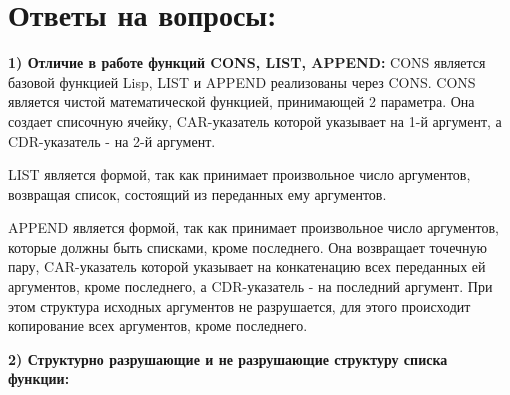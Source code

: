 \documentclass[a4paper, 12pt]{article}
\begin{document}
\section*{Ответы на вопросы:}
\hspace*{-7mm} \textbf{1) Отличие в работе функций CONS, LIST, APPEND:}
CONS является базовой функцией Lisp, LIST и APPEND реализованы через CONS. CONS является чистой математической функцией, принимающей 2 параметра. Она создает списочную ячейку, CAR-указатель которой указывает на 1-й аргумент, а CDR-указатель - на 2-й аргумент.

LIST является формой, так как принимает произвольное число аргументов, возвращая список, состоящий из переданных ему аргументов.

APPEND является формой, так как принимает произвольное число аргументов, которые должны быть списками, кроме последнего. Она возвращает точечную пару, CAR-указатель которой указывает на конкатенацию всех переданных ей аргументов, кроме последнего, а CDR-указатель - на последний аргумент. При этом структура исходных аргументов не разрушается, для этого происходит копирование всех аргументов, кроме последнего.

\hspace*{-13mm} \textbf{2) Структурно разрушающие и не разрушающие структуру списка функции:}
\\ 
\end{document}
